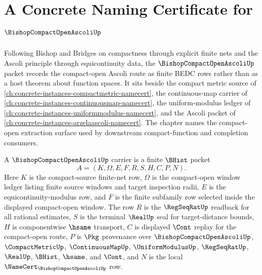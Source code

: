 \chapter{A Concrete Naming Certificate for $\BishopCompactOpenAscoliUp$}
\label{ch:concrete-instances-bishop-compact-open-ascoli-namecert}

Following Bishop and Bridges on compactness through explicit finite nets and the Ascoli principle through equicontinuity data, the $\BishopCompactOpenAscoliUp$ packet records the compact-open Ascoli route as finite BEDC rows rather than as a host theorem about function spaces. It sits beside the compact metric source of \autoref{ch:concrete-instances-compactmetric-namecert}, the continuous-map carrier of \autoref{ch:concrete-instances-continuousmap-namecert}, the uniform-modulus ledger of \autoref{ch:concrete-instances-uniformmodulus-namecert}, and the Ascoli packet of \autoref{ch:concrete-instances-arzelaascoli-namecert}. The chapter names the compact-open extraction surface used by downstream compact-function and completion consumers.

\begin{definition}
\label{def:bishop-compact-open-ascoli-carrier}
A $\BishopCompactOpenAscoliUp$ carrier is a finite $\BHist$ packet
$$
A=(K,\Omega,E,F,R,S,H,C,P,N).
$$
Here $K$ is the compact-source finite-net row, $\Omega$ is the compact-open window ledger listing finite source windows and target inspection radii, $E$ is the equicontinuity-modulus row, and $F$ is the finite subfamily row selected inside the displayed compact-open window. The row $R$ is the $\RegSeqRatUp$ readback for all rational estimates, $S$ is the terminal $\RealUp$ seal for target-distance bounds, $H$ is componentwise $\hsame$ transport, $C$ is displayed $\Cont$ replay for the compact-open route, $P$ is $\Pkg$ provenance over $\BishopCompactOpenAscoliUp$, $\CompactMetricUp$, $\ContinuousMapUp$, $\UniformModulusUp$, $\RegSeqRatUp$, $\RealUp$, $\BHist$, $\hsame$, and $\Cont$, and $N$ is the local $\NameCert_{\BishopCompactOpenAscoliUp}$ row.
\end{definition}

